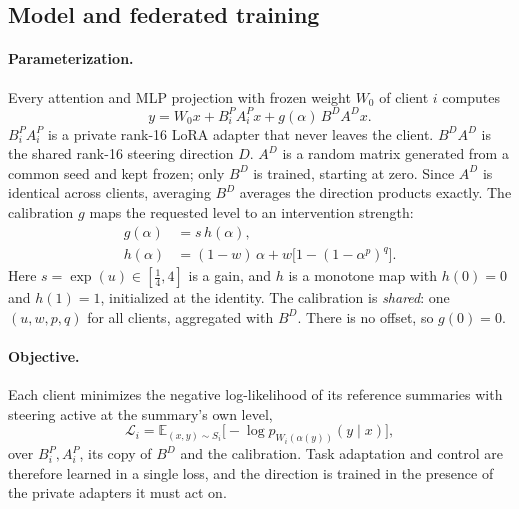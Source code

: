 \documentclass[11pt]{article}
\begin{document}
\subsection{Model and federated training}
\label{sec:setup-model}

\paragraph{Parameterization.}
Every attention and MLP projection with frozen weight $W_0$ of client $i$ computes
\begin{equation}
  y = W_0x + B_i^{P}A_i^{P}x + g(\alpha)\,B^{D}A^{D}x .
  \label{eq:steerlinear}
\end{equation}
$B_i^{P}A_i^{P}$ is a private rank-16 LoRA adapter that never leaves the client.
$B^{D}A^{D}$ is the shared rank-16 steering direction $D$.
$A^{D}$ is a random matrix generated from a common seed and kept frozen; only $B^{D}$ is trained, starting at zero.
Since $A^{D}$ is identical across clients, averaging $B^{D}$ averages the direction products exactly.
The calibration $g$ maps the requested level to an intervention strength:
\begin{align}
  g(\alpha) &= s\,h(\alpha), \\
  h(\alpha) &= (1-w)\,\alpha + w\bigl[1-(1-\alpha^{p})^{q}\bigr].
\end{align}
Here $s=\exp(u)\in[\tfrac14,4]$ is a gain, and $h$ is a monotone map with $h(0)=0$ and $h(1)=1$, initialized at the identity.
The calibration is \emph{shared}: one $(u,w,p,q)$ for all clients, aggregated with $B^{D}$.
There is no offset, so $g(0)=0$.

\paragraph{Objective.}
Each client minimizes the negative log-likelihood of its reference summaries with steering active at the summary's own level,
\begin{equation}
  \mathcal{L}_i = \mathbb{E}_{(x,y)\sim S_i}\bigl[-\log p_{W_i(\alpha(y))}(y\mid x)\bigr],
\end{equation}
over $B_i^{P}, A_i^{P}$, its copy of $B^{D}$ and the calibration.
Task adaptation and control are therefore learned in a single loss, and the direction is trained in the presence of the private adapters it must act on.
\end{document}
